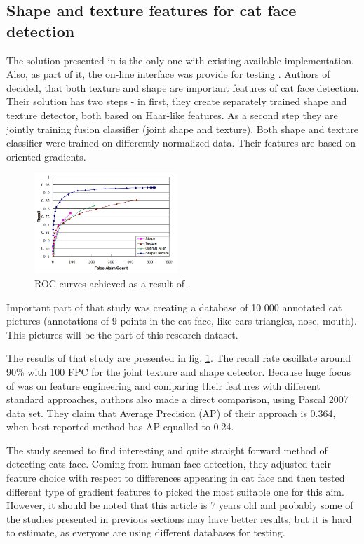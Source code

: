 \documentclass[hyperref]{acmtrans2e}
\begin{document}
\subsection{Shape and texture features for cat face detection}
\label{sec:demo}
The solution presented in \cite{shape:2008} is the only one with existing available implementation. Also, as part of it, the on-line interface was provide for testing \cite{demo:2013}. Authors of \cite{shape:2008} decided, that both texture and shape are important features of cat face detection. Their solution has two steps - in first, they create separately trained shape and texture detector, both based on Haar-like features. As a second step they are jointly training fusion classifier (joint shape and texture). Both shape and texture classifier were trained on differently normalized data. Their features are based on oriented gradients.

\begin{figure}
\centering
    \includegraphics[width=0.48\textwidth]{roc_shape}
  \caption{ROC curves achieved as a result of \protect\cite{shape:2008}.}
  \label{fig:roc_shape}
\end{figure}
Important part of that study was creating a database of 10 000 annotated cat pictures \cite{base:2008} (annotations of 9 points in the cat face, like ears triangles, nose, mouth). This pictures will be the part of this research dataset.

The results of that study are presented in fig. \ref{fig:roc_shape}. The recall rate oscillate around 90\% with 100 FPC for the joint texture and shape detector. Because huge focus of \cite{shape:2008} was on feature engineering and comparing their features with different standard approaches, authors also made a direct comparison, using Pascal 2007 data set. They claim that Average Precision (AP) of their approach is 0.364, when best reported method has AP equalled to 0.24. 

The study seemed to find interesting and quite straight forward method of detecting cats face. Coming from human face detection, they adjusted their feature choice with respect to differences appearing in cat face and then tested different type of gradient features to picked the most suitable one for this aim. However, it should be noted that this article is 7 years old and probably some of the studies presented in previous sections may have better results, but it is hard to estimate, as everyone are using different databases for testing.
\end{document}
